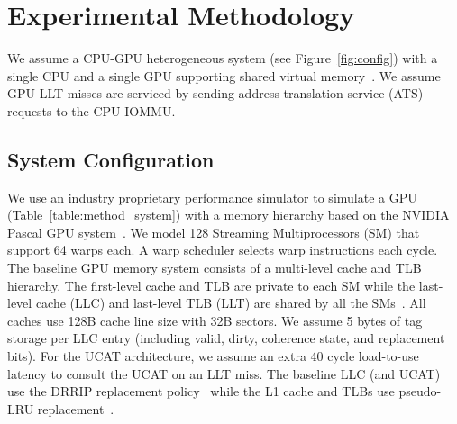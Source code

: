 


\section{Experimental Methodology}
\label{sec:method}

\noindent We assume a CPU-GPU heterogeneous system (see
Figure~\ref{fig:config}) with a single CPU and a single GPU supporting
shared virtual memory~\cite{intelgen9, amdzen, gpu_pascal}. We assume
GPU LLT misses are serviced by sending address translation service
(ATS) ~\cite{vesley2016ispass,ats_spec} requests to the CPU IOMMU.

\subsection{System Configuration}

\noindent We use an industry proprietary performance simulator to
simulate a GPU (Table~\ref{table:method_system}) with a memory
hierarchy based on the NVIDIA Pascal GPU system~\cite{gpu_pascal}. We
model 128 Streaming Multiprocessors (SM) that support 64 warps each. A
warp scheduler selects warp instructions each cycle. The baseline GPU
memory system consists of a multi-level cache and TLB hierarchy. The
first-level cache and TLB are private to each SM while the last-level
cache (LLC) and last-level TLB (LLT) are shared by all the
SMs~\cite{SharedLLT}. All caches use 128B cache line size with 32B
sectors. We assume 5 bytes of tag storage per LLC entry (including
valid, dirty, coherence state, and replacement bits). For the UCAT
architecture, we assume an extra 40 cycle load-to-use latency to
consult the UCAT on an LLT miss. The baseline LLC (and UCAT) use the
DRRIP replacement policy~\cite{jaleel_rrip} while the L1 cache and
TLBs use pseudo-LRU replacement~\cite{jaleel_rrip}.


